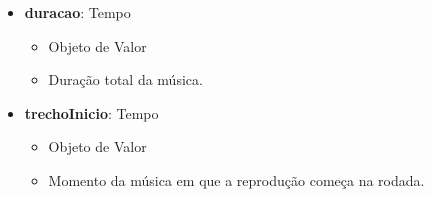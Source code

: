 \begin{itemize}
        \item \textbf{duracao}: Tempo  
              \begin{itemize}
                  \item Objeto de Valor
                  \item Duração total da música.
              \end{itemize}
    
        \item \textbf{trechoInicio}: Tempo  
              \begin{itemize}
                  \item Objeto de Valor
                  \item Momento da música em que a reprodução começa na rodada.
              \end{itemize}
    \end{itemize}
